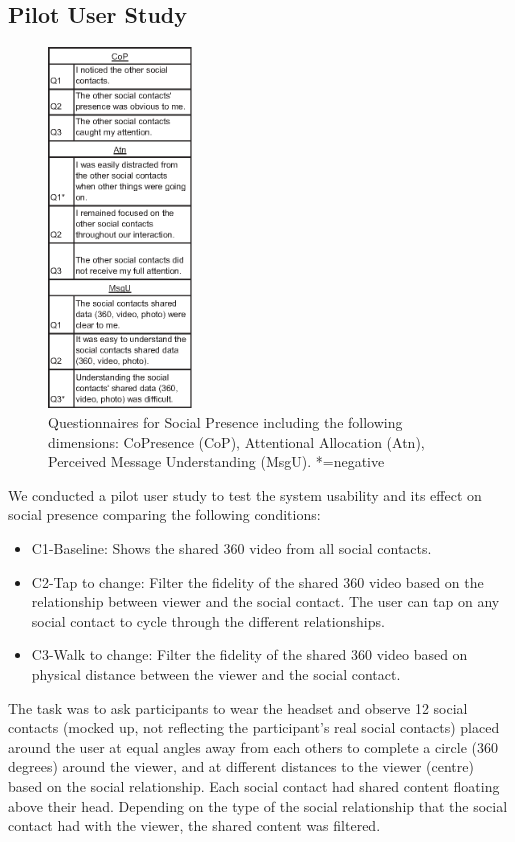 \subsection{Pilot User Study}

\begin{figure}[ht]
	\centering
	\includegraphics[width=1.5in]{images/chi/images-02.eps}
	\caption{Questionnaires for Social Presence including the following dimensions: CoPresence (CoP), Attentional Allocation (Atn), Perceived Message Understanding (MsgU). *=negative} 
  	\label{tbl:questions}
\end{figure}

We conducted a pilot user study to test the system usability and its effect on social presence comparing the following conditions: 

\begin{itemize}
    \item C1-Baseline: Shows the shared 360 video from all social contacts.
    \item C2-Tap to change: Filter the fidelity of the shared 360 video based on the relationship between viewer and the social contact. The user can tap on any social contact to cycle through the different relationships.
    \item C3-Walk to change: Filter the fidelity of the shared 360 video based on physical distance between the viewer and the social contact.
\end{itemize}

The task was to ask participants to wear the headset and observe 12 social contacts (mocked up, not reflecting the participant's real social contacts) placed around the user at equal angles away from each others to complete a circle (360 degrees) around the viewer, and at different distances to the viewer (centre)  based on the social relationship. 
Each social contact had shared content floating above their head. Depending on the type of the social relationship that the social contact had with the viewer, the shared content was filtered. 

